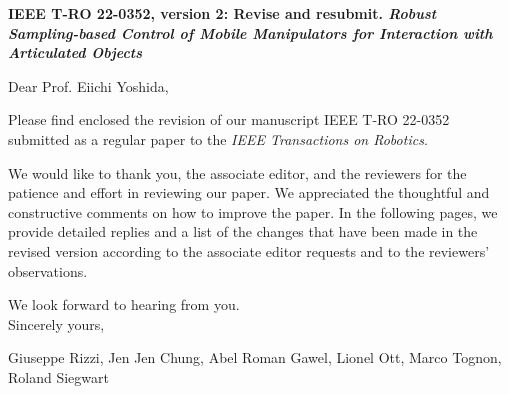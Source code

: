 \documentclass[10pt]{article}
\newcommand{\todo}[1]{\par\noindent{\color{mygreen}\raggedright\textsc{#1}\par\marginpar{\Large$\star\star$}}}
\newcommand{\journal}{IEEE Transactions on Robotics}
\newcommand{\journalRef}{IEEE T-RO 22-0352}
\newcommand{\editor}{Prof. Eiichi Yoshida}
\newcommand{\paperTitle}{Robust Sampling-based Control of Mobile Manipulators for Interaction with Articulated Objects}
\newcommand{\paperStatus}{Revise and resubmit}
\newcommand{\versionNum}{version 2}
\begin{document}
\noindent \textbf{\journalRef, \versionNum: \paperStatus. {\sl \paperTitle}}

\bigskip



\noindent
Dear \editor,

\noindent
Please find enclosed the revision of our manuscript \journalRef{} submitted
as a regular paper to the \textit{\journal}.

\noindent
We would like to thank you, the associate editor, and the reviewers for the patience and effort in reviewing our paper. We appreciated the thoughtful and
constructive comments on how to improve the paper. In the following pages, we provide detailed replies and a list of the changes that have been made in the revised version according to the associate editor requests and to the reviewers' observations.

\noindent
We look forward to hearing from you.\\
Sincerely yours,


\begin{flushright}
Giuseppe Rizzi, Jen Jen Chung, Abel Roman Gawel, Lionel Ott, Marco Tognon, Roland Siegwart
\end{flushright}
\clearpage


%
%
%
%
%
%
%
%
\end{document}
